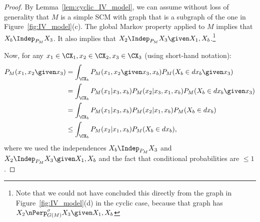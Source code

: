\begin{proof}
  By Lemma~\ref{lem:cyclic_IV_model}, we can assume without loss of generality that $M$ is a simple SCM with graph that is a subgraph of the one in Figure~\ref{fig:IV_model}(c).
  The global Markov property applied to $M$ implies that $X_b \Indep_{P_M} X_3$.
  It also implies that $X_2 \Indep_{P_M} X_3 \given X_1, X_b$.\footnote{Note that we could not have concluded this directly from the graph in Figure~\ref{fig:IV_model}(d) in the cyclic case, because that graph has $X_2 \nPerp^\sigma_{G(M)} X_3 \given X_1, X_b$}

  Now, for any $x_1 \in \CX_1, x_2 \in \CX_2, x_3 \in \CX_3$ (using short-hand notation):
  \begin{align*}
    P_M(x_1,x_2 \given x_3) 
    &= \int_{\CX_b} P_M(x_1,x_2 \given x_3,x_b) P_M(X_b \in dx_b \given x_3) \\
    &= \int_{\CX_b} P_M(x_1|x_3,x_b) P_M(x_2|x_3,x_1,x_b) P_M(X_b \in dx_b \given x_3) \\
    &= \int_{\CX_b} P_M(x_1|x_3,x_b) P_M(x_2|x_1,x_b) P_M(X_b \in dx_b) \\
    &\le \int_{\CX_b} P_M(x_2|x_1,x_b) P_M(X_b \in dx_b),
  \end{align*}
  where we used the independences $X_b \Indep_{P_M} X_3$ and $X_2 \Indep_{P_M} X_3 \given X_1, X_b$ and the fact that conditional probabilities are $\le 1$.


\end{proof}

